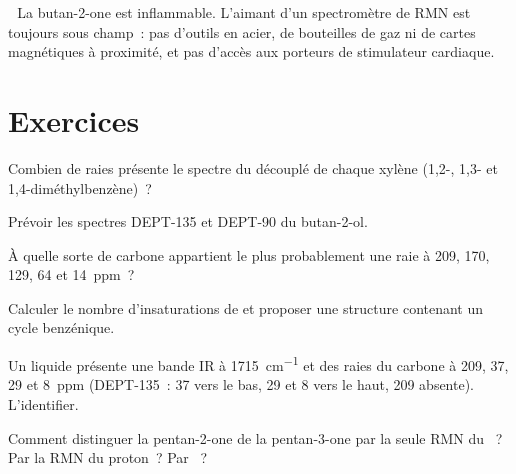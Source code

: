 \begin{safety}{\,\,}
La butan-2-one est inflammable. L'aimant d'un spectromètre de RMN est toujours sous champ~: pas d'outils
en acier, de bouteilles de gaz ni de cartes magnétiques à proximité, et pas d'accès aux porteurs de
stimulateur cardiaque.
\end{safety}

\section{Exercices}

\begin{exercise}[$\star$]\label{exo:b2:structure-determination:1}
Combien de raies présente le spectre du  découplé de chaque xylène (1,2-, 1,3- et
1,4-diméthylbenzène)~?
\end{exercise}

\begin{exercise}[$\star$]\label{exo:b2:structure-determination:2}
Prévoir les spectres DEPT-135 et DEPT-90 du butan-2-ol.
\end{exercise}

\begin{exercise}[$\star$]\label{exo:b2:structure-determination:3}
À quelle sorte de carbone appartient le plus probablement une raie à 209, 170, 129, 64 et 14~ppm~?
\end{exercise}

\begin{exercise}[$\star$]\label{exo:b2:structure-determination:4}
Calculer le nombre d'insaturations de  et proposer une structure contenant un cycle benzénique.
\end{exercise}

\begin{exercise}[$\star\star$]\label{exo:b2:structure-determination:5}
Un liquide  présente une bande IR à \qty{1715}{cm^{-1}} et des raies du carbone à 209, 37, 29
et 8~ppm (DEPT-135~: 37 vers le bas, 29 et 8 vers le haut, 209 absente). L'identifier.
\end{exercise}

\begin{exercise}[$\star\star$]\label{exo:b2:structure-determination:6}
Comment distinguer la pentan-2-one de la pentan-3-one par la seule RMN du ~? Par la RMN du
proton~? Par ~?
\end{exercise}

